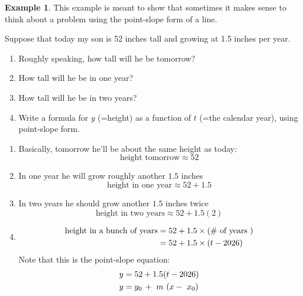 \documentclass[oneside]{book}
\theoremstyle{definition}
\newtheorem{example}{Example}
\newcommand{\handoutpagebreak}{}
\theoremstyle{solution}
\newtheorem*{solution}{Solution}
\newcommand{\handoutfill}{}
\newcommand{\handoutitemsep}{}
\newcommand{\handoutpagebreak}{\newpage}
\newenvironment{solution}{\vspace{2in}\comment}{\endcomment}
\newcommand{\handoutfill}{\vfill}
\newcommand{\handoutitemsep}{\itemsep=\fill}
\begin{document}
\handoutpagebreak
\begin{example}
\label{example:pair_and_share_retirement_point_slope_2}
This example is meant to show that sometimes it makes sense
to think about a problem using the point-slope form of a line.

Suppose that today my son is 52 inches tall and growing at 1.5 inches
per year.
\begin{enumerate}
\handoutitemsep
\item Roughly speaking, how tall will he be tomorrow?

\item How tall will he be in one year?  

\item How tall will he be in two years?  

\item Write a formula for $y$ (=height) as a function of
  $t$ (=the calendar year), using point-slope form.
\handoutfill
\end{enumerate}
\end{example}


\begin{solution}
\begin{enumerate}
\item Basically, tomorrow he'll be about the same height as today:
$$
\text{height tomorrow} \approx 52
$$

\item In one year he will grow roughly another $1.5$ inches
$$
\text{height in one year} \approx 52 + 1.5
$$

\item In two years he should grow another $1.5$ inches twice
$$
\text{height in two years} \approx 52 + 1.5(2)
$$

\item 
\begin{align*}
\text{height in a bunch of years} & = 52 + 1.5 \times (\text{\# of years })\\
     & = 52 + 1.5 \times (t - \the\year)
\end{align*}
Note that this is the point-slope equation:
\begin{align*}
y & = 52 + 1.5 (t-\the\year)\\
y & = y_0\, + \ m\  (x-\ x_0)
\end{align*}

\end{enumerate}
\end{solution}
\end{document}
